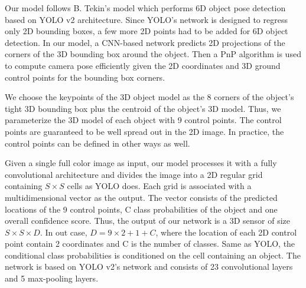 Our model follows B. Tekin's model \cite{tekin2018real} which performs 6D object pose detection based on YOLO v2 architecture. Since YOLO's network is designed to regress only 2D bounding boxes, a few more 2D points had to be added for 6D object detection. In our model, a CNN-based network predicts 2D projections of the corners of the 3D bounding box around the object. Then a PnP algorithm is used to compute camera pose efficiently given the 2D coordinates and 3D ground control points for the bounding box corners.

We choose the keypoints of the 3D object model as the 8 corners of the object's tight 3D bounding box plus the centroid of the object's 3D model. Thus, we parameterize the 3D model of each object with 9 control points. The control points are guaranteed to be well spread out in the 2D image. In practice, the control points can be defined in other ways as well.

Given a single full color image as input, our model processes it with a fully convolutional architecture and divides the image into a 2D regular grid containing $ S \times S $ cells as YOLO does. Each grid is associated with a multidimensional vector as the output. The vector consists of the predicted locations of the 9 control points, C class probabilities of the object and one overall confidence score. Thus, the output of our network is a 3D sensor of size $ S \times S \times D $. In out case, $D = 9\times2+1+C$, where the location of each 2D control point contain 2 coordinates and C is the number of classes. Same as YOLO, the conditional class probabilities is  conditioned on the cell containing an object. The network is based on YOLO v2's network and consists of 23 convolutional layers and 5 max-pooling layers.

